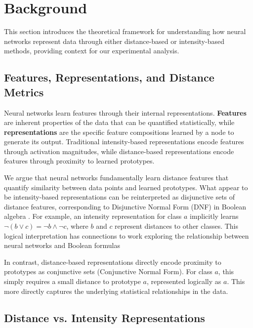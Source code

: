 \section{Background}
\label{sec:background}

This section introduces the theoretical framework for understanding how neural networks represent data through either distance-based or intensity-based methods, providing context for our experimental analysis.

\subsection{Features, Representations, and Distance Metrics}

Neural networks learn features through their internal representations. \textbf{Features} are inherent properties of the data that can be quantified statistically, while \textbf{representations} are the specific feature compositions learned by a node to generate its output. Traditional intensity-based representations encode features through activation magnitudes, while distance-based representations encode features through proximity to learned prototypes.

We argue that neural networks fundamentally learn distance features that quantify similarity between data points and learned prototypes. What appear to be intensity-based representations can be reinterpreted as disjunctive sets of distance features, corresponding to Disjunctive Normal Form (DNF) in Boolean algebra \cite{post1921introduction}. For example, an intensity representation for class $a$ implicitly learns $\lnot(b \lor c) = \lnot b \land \lnot c$, where $b$ and $c$ represent distances to other classes. This logical interpretation has connections to work exploring the relationship between neural networks and Boolean formulas \cite{cite_boolean_neural_nets}

In contrast, distance-based representations directly encode proximity to prototypes as conjunctive sets (Conjunctive Normal Form). For class $a$, this simply requires a small distance to prototype $a$, represented logically as $a$. This more directly captures the underlying statistical relationships in the data.

\subsection{Distance vs. Intensity Representations}
\label{subsec:dist-intensity-rep}

